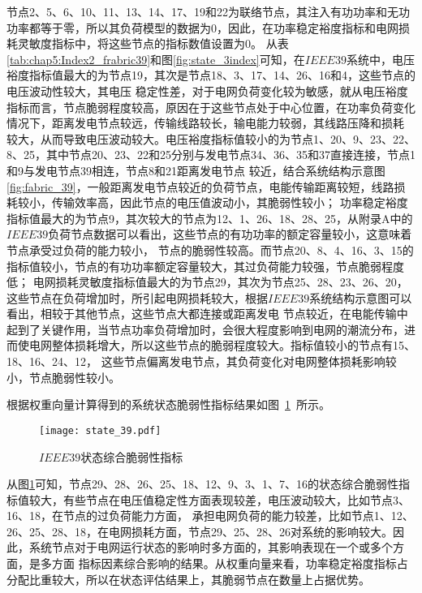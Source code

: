 节点2、5、6、10、11、13、14、17、19和22为联络节点，其注入有功功率和无功功率都等于零，所以其负荷模型的数据为0，因此，在功率稳定裕度指标和电网损耗灵敏度指标中，将这些节点的指标数值设置为0。
从表\ref{tab:chap5:Index2_frabric39}和图\ref{fig:state_3index}可知，在$IEEE39$系统中，电压裕度指标值最大的为节点19，其次是节点18、3、17、14、26、16和4，这些节点的电压波动性较大，其电压
稳定性差，对于电网负荷变化较为敏感，就从电压裕度指标而言，节点脆弱程度较高，原因在于这些节点处于中心位置，在功率负荷变化情况下，距离发电节点较远，传输线路较长，输电能力较弱，其线路压降和损耗
较大，从而导致电压波动较大。电压裕度指标值较小的为节点1、20、9、23、22、8、25，其中节点20、23、22和25分别与发电节点34、36、35和37直接连接，节点1和9与发电节点39相连，节点8和21距离发电节点
较近，结合系统结构示意图\ref{fig:fabric_39}，一般距离发电节点较近的负荷节点，电能传输距离较短，线路损耗较小，传输效率高，因此节点的电压值波动小，其脆弱性较小；
功率稳定裕度指标值最大的为节点9，其次较大的节点为12、1、26、18、28、25，从附录A中的$IEEE39$负荷节点数据可以看出，这些节点的有功功率的额定容量较小，这意味着节点承受过负荷的能力较小，
节点的脆弱性较高。而节点20、8、4、16、3、15的指标值较小，节点的有功功率额定容量较大，其过负荷能力较强，节点脆弱程度低；
电网损耗灵敏度指标值最大的为节点29，其次为节点25、28、23、26、20，这些节点在负荷增加时，所引起电网损耗较大，根据$IEEE39$系统结构示意图可以看出，相较于其他节点，这些节点大都连接或距离发电
节点较近，在电能传输中起到了关键作用，当节点功率负荷增加时，会很大程度影响到电网的潮流分布，进而使电网整体损耗增大，所以这些节点的脆弱程度较大。指标值较小的节点有15、18、16、24、12，
这些节点偏离发电节点，其负荷变化对电网整体损耗影响较小，节点脆弱性较小。


根据权重向量计算得到的系统状态脆弱性指标结果如图~\ref{fig:state_39}~所示。
\begin{figure}[H] %
  \centering
  \texttt{[image: state\_39.pdf]}
  \caption{$IEEE39$状态综合脆弱性指标}
  \label{fig:state_39}
\end{figure}
从图\ref{fig:state_39}可知，节点29、28、26、25、18、12、9、3、1、7、16的状态综合脆弱性指标值较大，有些节点在电压值稳定性方面表现较差，电压波动较大，比如节点3、16、18，在节点的过负荷能力方面，
承担电网负荷的能力较差，比如节点1、12、26、25、28、18，在电网损耗方面，节点29、25、28、26对系统的影响较大。因此，系统节点对于电网运行状态的影响时多方面的，其影响表现在一个或多个方面，是多方面
指标因素综合影响的结果。从权重向量来看，功率稳定裕度指标占分配比重较大，所以在状态评估结果上，其脆弱节点在数量上占据优势。


